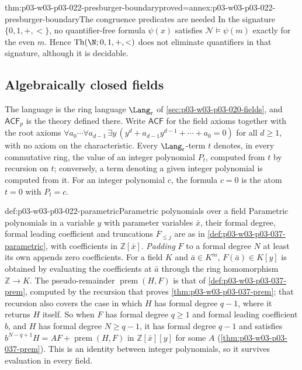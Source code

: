 \begin{hblemma}{thm:p03-w03-p03-022-presburger-boundary}{proved=annex:p03-w03-p03-022-presburger-boundary}{The congruence predicates are needed}
In the signature \(\{0,1,+,<\}\), no quantifier-free formula \(\psi(x)\)
satisfies \(\mathcal N\models\psi(m)\) exactly for the even \(m\). Hence
\(\operatorname{Th}(\N;0,1,+,<)\) does not eliminate quantifiers in that
signature, although it is decidable.
\end{hblemma}

\subsection{Algebraically closed fields}
\label{sec:p03-w03-p03-022-acf}

The language is the ring language \(\Lang_{\mathrm r}\) of
\cref{sec:p03-w03-p03-020-fields}, and \(\mathsf{ACF}_p\) is the theory
defined there. Write \(\mathsf{ACF}\) for the field axioms together with
the root axioms \(\forall a_0\cdots\forall a_{d-1}\,\exists y\,
(y^d+a_{d-1}y^{d-1}+\cdots+a_0=0)\) for all \(d\ge1\), with no axiom on the
characteristic. Every \(\Lang_{\mathrm r}\)-term \(t\) denotes, in every
commutative ring, the value of an integer polynomial \(P_t\), computed from
\(t\) by recursion on \(t\); conversely, a term denoting a given integer
polynomial is computed from it. For an integer polynomial \(c\), the
formula \(c=0\) is the atom \(t=0\) with \(P_t=c\).

\begin{hbconvention}{def:p03-w03-p03-022-parametric}{Parametric polynomials over a field}
Parametric polynomials in a variable \(y\) with parameter variables
\(\bar x\), their formal degree, formal leading coefficient and truncations
\(F_{\le j}\) are as in \cref{def:p03-w03-p03-037-parametric}, with
coefficients in \(\mathbb Z[\bar x]\). \emph{Padding} \(F\) to a formal
degree \(N\) at least its own appends zero coefficients. For a field \(K\)
and \(\bar a\in K^m\), \(F(\bar a)\in K[y]\) is obtained by evaluating the
coefficients at \(\bar a\) through the ring homomorphism
\(\mathbb Z\to K\). The pseudo-remainder \(\operatorname{prem}(H,F)\) is
that of \cref{def:p03-w03-p03-037-prem}, computed by the recursion that
proves \cref{thm:p03-w03-p03-037-prem}; that recursion also covers the
case in which \(H\) has formal degree \(q-1\), where it returns \(H\)
itself. So when \(F\) has formal degree
\(q\ge1\) and formal leading coefficient \(b\), and \(H\) has formal degree
\(N\ge q-1\), it has formal degree \(q-1\) and satisfies
\(b^{N-q+1}H=AF+\operatorname{prem}(H,F)\) in \(\mathbb Z[\bar x][y]\) for
some \(A\) (\cref{thm:p03-w03-p03-037-prem}). This is an identity between
integer polynomials, so it survives evaluation in every field.
\end{hbconvention}

